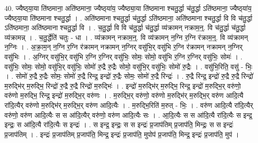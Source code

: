\documentclass[17pt]{extarticle}
\begin{document}
40. ज्यैष्ठ्‍या॒या ति॑ष्ठमाना॒ अति॑ष्ठमाना॒ ज्यैष्ठ्‍या॑य॒ ज्यैष्ठ्या॒या ति॑ष्ठमाना श्चतु॒र्द्धा च॑तु॒र्द्धा ऽति॑ष्ठमाना॒ ज्यैष्ठ्‍या॑य॒ ज्यैष्ठ्‍या॒या ति॑ष्ठमाना श्चतु॒र्द्धा । . अति॑ष्ठमाना श्चतु॒र्द्धा च॑तु॒र्द्धा ऽति॑ष्ठमाना॒ अति॑ष्ठमाना श्चतु॒र्द्धा वि वि च॑तु॒र्द्धा ऽति॑ष्ठमाना॒ अति॑ष्ठमाना श्चतु॒र्द्धा वि । . च॒तु॒र्द्धा वि वि च॑तु॒र्द्धा च॑तु॒र्द्धा व्य॑क्रामन् नक्राम॒न्॒. वि च॑तु॒र्द्धा च॑तु॒र्द्धा व्य॑क्रामन्न् । . च॒तु॒र्द्धेति॑ चतुः - धा । . व्य॑क्रामन् नक्राम॒न्॒. वि व्य॑क्रामन् न॒ग्नि र॒ग्नि र॑क्राम॒न्॒. वि व्य॑क्रामन् न॒ग्निः । . अ॒क्रा॒म॒न् न॒ग्नि र॒ग्नि र॑क्रामन् नक्रामन् न॒ग्निर् वसु॑भि॒र् वसु॑भि र॒ग्नि र॑क्रामन् नक्रामन् न॒ग्निर् वसु॑भिः । . अ॒ग्निर् वसु॑भि॒र् वसु॑भि र॒ग्नि र॒ग्निर् वसु॑भिः॒ सोमः॒ सोमो॒ वसु॑भि र॒ग्नि र॒ग्निर् वसु॑भिः॒ सोमः॑ । . वसु॑भिः॒ सोमः॒ सोमो॒ वसु॑भि॒र् वसु॑भिः॒ सोमो॑ रु॒द्रै रु॒द्रैः सोमो॒ वसु॑भि॒र् वसु॑भिः॒ सोमो॑ रु॒द्रैः । . वसु॑भि॒रिति॒ वसु॑ - भिः॒ । . सोमो॑ रु॒द्रै रु॒द्रैः सोमः॒ सोमो॑ रु॒द्रै रिन्द्र॒ इन्द्रो॑ रु॒द्रैः सोमः॒ सोमो॑ रु॒द्रै रिन्द्रः॑ । . रु॒द्रै रिन्द्र॒ इन्द्रो॑ रु॒द्रै रु॒द्रै रिन्द्रो॑ म॒रुद्भि॑र् म॒रुद्भि॒ रिन्द्रो॑ रु॒द्रै रु॒द्रै रिन्द्रो॑ म॒रुद्भिः॑ । . इन्द्रो॑ म॒रुद्भि॑र् म॒रुद्भि॒ रिन्द्र॒ इन्द्रो॑ म॒रुद्भि॒र् वरु॑णो॒ वरु॑णो म॒रुद्भि॒ रिन्द्र॒ इन्द्रो॑ म॒रुद्भि॒र् वरु॑णः । . म॒रुद्भि॒र् वरु॑णो॒ वरु॑णो म॒रुद्भि॑र् म॒रुद्भि॒र् वरु॑ण आदि॒त्यै रा॑दि॒त्यैर् वरु॑णो म॒रुद्भि॑र् म॒रुद्भि॒र् वरु॑ण आदि॒त्यैः । . म॒रुद्भि॒रिति॑ म॒रुत् - भिः॒ । . वरु॑ण आदि॒त्यै रा॑दि॒त्यैर् वरु॑णो॒ वरु॑ण आदि॒त्यैः स स आ॑दि॒त्यैर् वरु॑णो॒ वरु॑ण आदि॒त्यैः सः । . आ॒दि॒त्यैः स स आ॑दि॒त्यै रा॑दि॒त्यैः स इन्द्र॒ इन्द्रः॒ स आ॑दि॒त्यै रा॑दि॒त्यैः स इन्द्रः॑ । . स इन्द्र॒ इन्द्रः॒ स स इन्द्रः॑ प्र॒जाप॑तिम् प्र॒जाप॑ति॒ मिन्द्रः॒ स स इन्द्रः॑ प्र॒जाप॑तिम् । . इन्द्रः॑ प्र॒जाप॑तिम् प्र॒जाप॑ति॒ मिन्द्र॒ इन्द्रः॑ प्र॒जाप॑ति॒ मुपोप॑ प्र॒जाप॑ति॒ मिन्द्र॒ इन्द्रः॑ प्र॒जाप॑ति॒ मुप॑ । \newline
\end{document}
